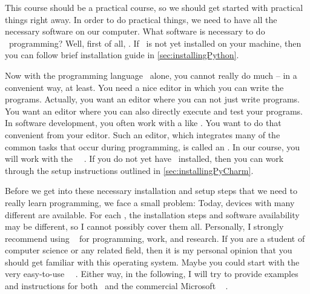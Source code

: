 %
%
This course should be a practical course, so we should get started with practical things right away.
In order to do practical things, we need to have all the necessary software on our computer.
What software is necessary to do \python\ programming?
Well, first of all, \python.
If \python\ is not yet installed on your machine, then you can follow brief installation guide in \cref{sec:installingPython}.

Now with the programming language \python\ alone, you cannot really do much -- in a convenient way, at least.
You need a nice editor in which you can write the programs.
Actually, you want an editor where you can not just write programs.
You want an editor  where you can also directly execute and test your programs.
In software development, you often work with a  like \git.
You want to do that convenient from your editor.
Such an editor, which integrates many of the common tasks that occur during programming, is called an .
In our course, you will work with the \pycharm\ ~\cite{VHN2023HOADWP}.
If you do not yet have \pycharm\ installed, then you can work through the setup instructions outlined in \cref{sec:installingPyCharm}.

Before we get into these necessary installation and setup steps that we need to really learn programming, we face a small problem:
Today, devices with many different  are available.
For each , the installation steps and software availability may be different, so I cannot possibly cover them all.
Personally, I strongly recommend using \linux~\cite{T1999TLE} for programming, work, and research.
If you are a student of computer science or any related field, then it is my personal opinion that you should get familiar with this operating system.
Maybe you could start with the very easy-to-use \ubuntu\ \linux~\cite{CN2020ULB}.
Either way, in the following, I will try to provide examples and instructions for both \ubuntu\ and the commercial Microsoft \windows~\cite{B2023W1IO} .
%
%
%
%
\endhsection%
%
